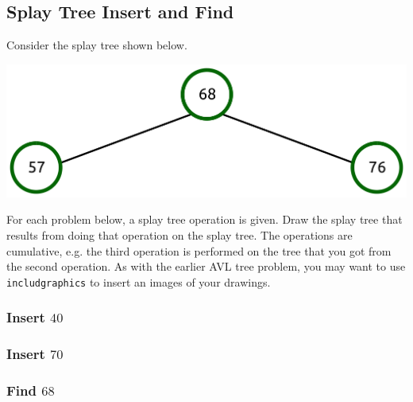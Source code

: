 \documentclass{article}
\begin{document}
\subsection{Splay Tree Insert and Find}

Consider the splay tree shown below.

\includegraphics[scale=0.3]{splay_tree_insert_problem}

For each problem below, a splay tree operation is given. Draw the splay tree that results from doing that operation on the splay tree. The operations are cumulative, e.g. the third operation is performed on the tree that you got from the second operation. As with the earlier AVL tree problem, you may want to use \lstinline{includgraphics} to insert an images of your drawings.

\subsubsection{Insert $40$}

\begin{mdframed}
\vspace{3em}
\end{mdframed}

\subsubsection{Insert $70$}

\begin{mdframed}
\vspace{3em}
\end{mdframed}

\subsubsection{Find $68$}

\begin{mdframed}
\vspace{3em}
\end{mdframed}
\end{document}
